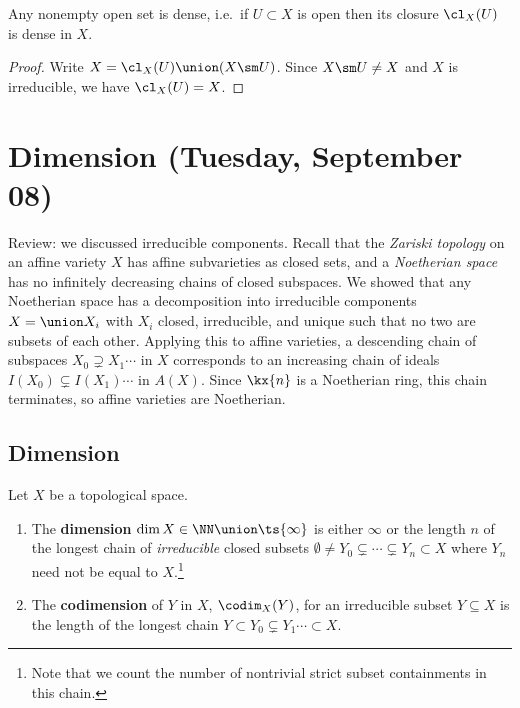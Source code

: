 \begin{proposition}[?]

Any nonempty open set is dense, i.e.~if \(U\subset X\) is open then its
closure \(\cl_X(U)\) is dense in \(X\).

\end{proposition}

\begin{proof}

Write \(X = \cl_X(U) \union (X\sm U)\). Since \(X\sm U \neq X\) and
\(X\) is irreducible, we have \(\cl_X(U) = X\).

\end{proof}

\hypertarget{dimension-tuesday-september-08}{%
\section{Dimension (Tuesday, September
08)}\label{dimension-tuesday-september-08}}

Review: we discussed irreducible components. Recall that the
\emph{Zariski topology} on an affine variety \(X\) has affine
subvarieties as closed sets, and a \emph{Noetherian space} has no
infinitely decreasing chains of closed subspaces. We showed that any
Noetherian space has a decomposition into irreducible components
\(X = \union X_i\) with \(X_i\) closed, irreducible, and unique such
that no two are subsets of each other. Applying this to affine
varieties, a descending chain of subspaces \(X_0 \supsetneq X_1 \cdots\)
in \(X\) corresponds to an increasing chain of ideals
\(I(X_0) \subsetneq I(X_1) \cdots\) in \(A(X)\). Since \(\kx{n}\) is a
Noetherian ring, this chain terminates, so affine varieties are
Noetherian.

\hypertarget{dimension}{%
\subsection{Dimension}\label{dimension}}

\begin{definition}[Dimensions]

Let \(X\) be a topological space.

\begin{enumerate}
\def\labelenumi{\arabic{enumi}.}
\item
  The \textbf{dimension} \(\dim X \in \NN\union\ts{\infty}\) is either
  \(\infty\) or the length \(n\) of the longest chain of
  \emph{irreducible} closed subsets
  \(\emptyset \neq Y_0 \subsetneq \cdots \subsetneq Y_n \subset X\)
  where \(Y_n\) need not be equal to \(X\).\footnote{Note that we count
    the number of nontrivial strict subset containments in this chain.}
\item
  The \textbf{codimension} of \(Y\) in \(X\), \(\codim_X(Y)\), for an
  irreducible subset \(Y\subseteq X\) is the length of the longest chain
  \(Y\subset Y_0 \subsetneq Y_1 \cdots \subset X\).
\end{enumerate}

\end{definition}

